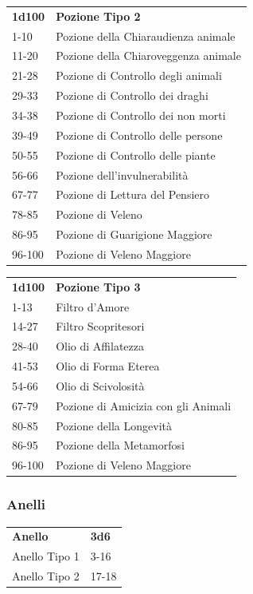 \begin{multicols}{2}
	\medskip

	\begin{tabular}{ll}
		\textbf{1d100} & \textbf{Pozione Tipo 2}\\
		1-10   &Pozione della Chiaraudienza animale\\
		11-20  &Pozione della Chiaroveggenza animale\\
		21-28  &Pozione di Controllo degli animali\\
		29-33  &Pozione di Controllo dei draghi\\
		34-38  &Pozione di Controllo dei non morti\\
		39-49  &Pozione di Controllo delle persone\\
		50-55  &Pozione di Controllo delle piante\\
		56-66  &Pozione dell’invulnerabilità\\
		67-77  &Pozione di Lettura del Pensiero\\
		78-85  &Pozione di Veleno\\
		86-95  &Pozione di Guarigione Maggiore\\
		96-100 &Pozione di Veleno Maggiore\\
	\end{tabular}

	\medskip

	\begin{tabular}{ll}
		\textbf{1d100} & \textbf{Pozione Tipo 3}\\
		1-13  & Filtro d'Amore\\
		14-27 & Filtro Scopritesori\\
		28-40 & Olio di Affilatezza\\
		41-53 & Olio di Forma Eterea\\
		54-66 & Olio di Scivolosità\\
		67-79 & Pozione di Amicizia con gli Animali\\
		80-85 & Pozione della Longevità\\
		86-95 & Pozione della Metamorfosi\\
		96-100& Pozione di Veleno Maggiore\\
	\end{tabular}

	\subsubsection{Anelli}

	\begin{tabular}{ll}
		\textbf{Anello}&\textbf{3d6}\\
		Anello Tipo 1 &3-16\\
		Anello Tipo 2 &17-18\\
	\end{tabular}


\end{multicols}
